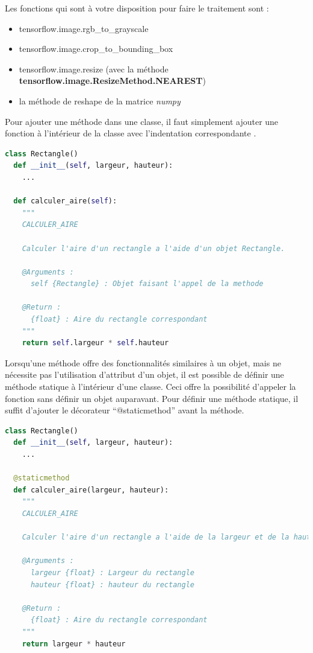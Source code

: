 \documentclass{article}
\begin{document}
\bigbreak
Les fonctions qui sont à votre disposition pour faire le traitement sont :
\begin{itemize}
  \item tensorflow.image.rgb\_to\_grayscale
  \item tensorflow.image.crop\_to\_bounding\_box
  \item tensorflow.image.resize (avec la méthode \textbf{tensorflow.image.ResizeMethod.NEAREST})
  \item la méthode de reshape de la matrice \textit{numpy}
\end{itemize}

\bigbreak
Pour ajouter une méthode dans une classe, il faut simplement ajouter une fonction à l'intérieur de la classe avec l'indentation correspondante .

\bigbreak
\begin{lstlisting}[language=Python, caption={Définition d'une méthode statique}, label={code:method}]
class Rectangle()
  def __init__(self, largeur, hauteur):
    ...

  def calculer_aire(self):
    """
    CALCULER_AIRE

    Calculer l'aire d'un rectangle a l'aide d'un objet Rectangle.

    @Arguments :
      self {Rectangle} : Objet faisant l'appel de la methode

    @Return :
      {float} : Aire du rectangle correspondant
    """
    return self.largeur * self.hauteur
\end{lstlisting}

\bigbreak
Lorsqu'une méthode offre des fonctionnalités similaires à un objet, mais ne nécessite pas l'utilisation d'attribut d'un objet, il est possible de définir une méthode statique à l'intérieur d'une classe. Ceci offre la possibilité d'appeler la fonction sans définir un objet auparavant. Pour définir une méthode statique, il suffit d'ajouter le décorateur ``@staticmethod'' avant la méthode.

\bigbreak
\begin{lstlisting}[language=Python, caption={Définition d'une méthode statique}, label={code:static}]
class Rectangle()
  def __init__(self, largeur, hauteur):
    ...

  @staticmethod
  def calculer_aire(largeur, hauteur):
    """
    CALCULER_AIRE

    Calculer l'aire d'un rectangle a l'aide de la largeur et de la hauteur.

    @Arguments :
      largeur {float} : Largeur du rectangle
      hauteur {float} : hauteur du rectangle

    @Return :
      {float} : Aire du rectangle correspondant
    """
    return largeur * hauteur
\end{lstlisting}
\end{document}
